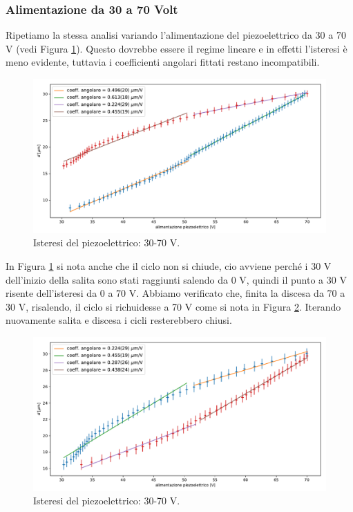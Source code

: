 \documentclass[a4paper]{article}
\begin{document}
\subsubsection{Alimentazione da 30 a 70 Volt}
Ripetiamo la stessa analisi variando l'alimentazione del piezoelettrico da 30 a 70 V (vedi Figura \ref{fig:30-70-1}). Questo dovrebbe essere il regime lineare e in effetti l'isteresi è meno evidente, tuttavia i coefficienti angolari fittati restano incompatibili.
\begin{figure}[H]
	\includegraphics[width=1\textwidth]{isteresi_30-70-1.pdf}
	\caption{Isteresi del piezoelettrico: 30-70 V.}
	\label{fig:30-70-1}
\end{figure}
 In Figura \ref{fig:30-70-1} si nota anche che il ciclo non si chiude, cio avviene perché i 30 V dell'inizio della salita sono stati raggiunti salendo da 0 V, quindi il punto a 30 V risente dell'isteresi da 0 a 70 V. Abbiamo verificato che, finita la discesa da 70 a 30 V, risalendo, il ciclo si richuidesse a 70 V come si nota in Figura \ref{fig:30-70-2}. Iterando nuovamente salita e discesa i cicli resterebbero chiusi.
 \begin{figure}[H]
 	\includegraphics[width=1\textwidth]{isteresi_30-70-2.pdf}
 	\caption{Isteresi del piezoelettrico: 30-70 V.}
 	\label{fig:30-70-2}
 \end{figure}
\end{document}

